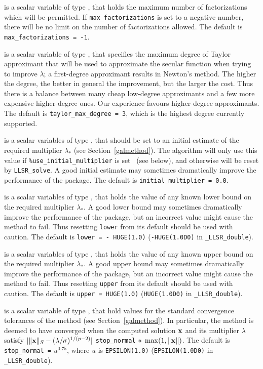 \documentclass{galahad}
\newcommand{\packagename}{LLSR}
\newcommand{\fullpackagename}{\libraryname\_\packagename}
\begin{document}
\begin{description}
 is a scalar variable of type \integer,
that holds the maximum number of factorizations which will be permitted.
If {\tt max\_factorizations} is set to a negative number, there will be
no limit on the number of factorizations allowed.
The default is {\tt max\_factorizations = -1}.

 is a scalar variable of type \integer,
that specifies the maximum degree of Taylor approximant that will be used
to approximate the secular function when trying to improve $\lambda$;
a first-degree approximant results in Newton's method.
The higher the degree, the better in general the improvement, but the larger the
cost. Thus there is a balance between many cheap low-degree approximants
and a few more expensive higher-degree ones. Our experience favours
higher-degree approximants.
The default is {\tt taylor\_max\_degree = 3}, which is the highest degree
currently supported.

 is a scalar variables of type \realdp, that should
be set to an initial estimate of the required multiplier $\lambda_*$
(see Section~\ref{galmethod}). The algorithm will only use this value
if {\tt \%use\_initial\_multiplier} is set \true\ (see below), and otherwise
will be reset by {\tt \packagename\_solve}. A good initial estimate
may sometimes dramatically improve the performance of the package.
The default is {\tt initial\_multiplier = 0.0}.

 is a scalar variables of type \realdp, that holds the value
of any known lower bound on the required multiplier $\lambda_*$. A good lower
bound may sometimes dramatically improve the performance of the package, but
an incorrect value might cause the method to fail. Thus resetting
{\tt lower} from its default should be used with caution.
The default is {\tt lower = - HUGE(1.0)}
({\tt -HUGE(1.0D0)} in {\tt \fullpackagename\_double}).

 is a scalar variables of type \realdp, that holds the value
of any known upper bound on the required multiplier $\lambda_*$. A good upper
bound may sometimes dramatically improve the performance of the package, but
an incorrect value might cause the method to fail. Thus resetting
{\tt upper} from its default should be used with caution.
The default is {\tt upper = HUGE(1.0)}
({\tt HUGE(1.0D0)} in {\tt \fullpackagename\_double}).

 is a scalar variable of type \realdp,
that hold values for the standard convergence tolerances of the method
(see Section~\ref{galmethod}).
In particular, the method is deemed to have converged when the
computed solution ${\mathbf{x}}$ and its multiplier $\lambda$ satisfy
$|\|{\mathbf{x}}\|_S -  (\lambda/\sigma)^{1/(p-2)}|$
{\tt stop\_normal} $\ast \; \max(1,\|{\mathbf{x}}\|)$.
The default is {\tt stop\_normal =} $u^{0.75}$,
where $u$ is {\tt EPSILON(1.0)} ({\tt EPSILON(1.0D0)} in
{\tt \fullpackagename\_double}).


\end{description}
\end{document}
